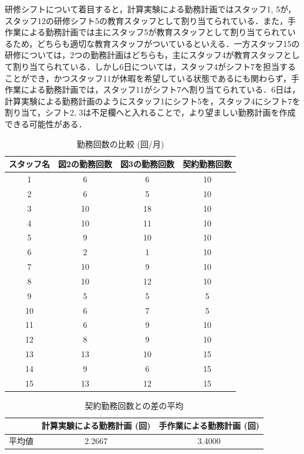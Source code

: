 \documentclass[11pt]{jsarticle}
\begin{document}
研修シフトについて着目すると，計算実験による勤務計画ではスタッフ1, 5が，スタッフ12の研修シフト5の教育スタッフとして割り当てられている．また，手作業による勤務計画では主にスタッフ5が教育スタッフとして割り当てられているため，どちらも適切な教育スタッフがついているといえる．一方スタッフ15の研修については，2つの勤務計画はどちらも，主にスタッフ4が教育スタッフとして割り当てられている．しかし6日については，スタッフ4がシフト7を担当することができ，かつスタッフ11が休暇を希望している状態であるにも関わらず，手作業による勤務計画では，スタッフ11がシフト7へ割り当てられている．6日は，計算実験による勤務計画のようにスタッフ1にシフト5を，スタッフ4にシフト7を割り当て，シフト2, 3は不足欄へと入れることで，より望ましい勤務計画を作成できる可能性がある．

\vspace{\baselineskip}
\begin{table}[htb]
  \begin{center}
    \caption{勤務回数の比較 (回/月) }
    \begin{tabular}{cccc}
      \hline \hline
      スタッフ名 & 図2の勤務回数 & 図3の勤務回数 & 契約勤務回数 \\ \hline
      1 & 6 & 6 & 10 \\
      2 & 6 & 5 & 10 \\
      3 & 10 & 18 & 10 \\
      4 & 10 & 11 & 10 \\
      5 & 9 & 10 & 10 \\
      6 & 2 & 1 & 10 \\
      7 & 10 & 9 & 10 \\
      8 & 10 & 12 & 10 \\
      9 & 5 & 5 & 5 \\
      10 & 6 & 7 & 5 \\
      11 & 6 & 9 & 10 \\
      12 & 8 & 9 & 10 \\
      13 & 13 & 10 & 15 \\
      14 & 9 & 6 & 15 \\
      15 & 13 & 12 & 15 \\ \hline \hline
    \end{tabular}
    \label{tab:compare}
  \end{center}
\end{table}
\begin{table}[htb]
  \begin{center}
    \caption{契約勤務回数との差の平均}
    \begin{tabular}{ccc}
      \hline \hline
      & 計算実験による勤務計画 (回) & 手作業による勤務計画 (回) \\ \hline
      平均値 & 2.2667 & 3.4000 \\ \hline \hline
    \end{tabular}
    \label{tab:mean_stdev}
  \end{center}
\end{table}
\end{document}
